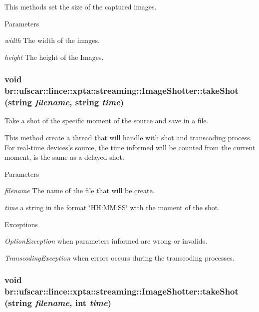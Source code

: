 This methods set the size of the captured images. 


\begin{DoxyParams}{Parameters}
\item[{\em width}]The width of the images. \item[{\em height}]The height of the Images. \end{DoxyParams}
\hypertarget{classbr_1_1ufscar_1_1lince_1_1xpta_1_1streaming_1_1ImageShotter_a63be9fc7d24a3b4a5951378b3192d85c}{
\subsubsection[{takeShot}]{\setlength{\rightskip}{0pt plus 5cm}void br::ufscar::lince::xpta::streaming::ImageShotter::takeShot (string {\em filename}, \/  string {\em time})}}
\label{classbr_1_1ufscar_1_1lince_1_1xpta_1_1streaming_1_1ImageShotter_a63be9fc7d24a3b4a5951378b3192d85c}


Take a shot of the specific moment of the source and save in a file. 

This method create a thread that will handle with shot and transcoding process. For real-\/time devices's source, the time informed will be counted from the current moment, is the same as a delayed shot. 
\begin{DoxyParams}{Parameters}
\item[{\em filename}]The name of the file that will be create. \item[{\em time}]a string in the format \char`\"{}HH:MM:SS\char`\"{} with the moment of the shot. \end{DoxyParams}

\begin{DoxyExceptions}{Exceptions}
\item[{\em OptionException}]when parameters informed are wrong or invalids. \item[{\em TranscodingException}]when errors occurs during the transcoding processes. \end{DoxyExceptions}
\hypertarget{classbr_1_1ufscar_1_1lince_1_1xpta_1_1streaming_1_1ImageShotter_a5a0a946cefef2f0c45d1c5f16ac5929a}{
\subsubsection[{takeShot}]{\setlength{\rightskip}{0pt plus 5cm}void br::ufscar::lince::xpta::streaming::ImageShotter::takeShot (string {\em filename}, \/  int {\em time})}}
\label{classbr_1_1ufscar_1_1lince_1_1xpta_1_1streaming_1_1ImageShotter_a5a0a946cefef2f0c45d1c5f16ac5929a}



